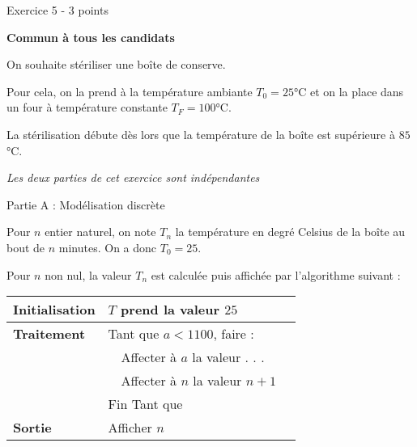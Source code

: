 
%
\begin{h2}Exercice 5 - 3 points\end{h2} 
\par
\textbf{Commun à tous les candidats}
\par
On souhaite stériliser une boîte de conserve.
\par
Pour cela, on la prend à la température ambiante $T_0 = 25$°C et on la place dans un four à température constante $T_F = 100$°C.
\par
La stérilisation débute dès lors que la température de la boîte est supérieure à $85$°C.
\par
\textit{Les deux parties de cet exercice sont indépendantes}
\par
\begin{h3}Partie A : Modélisation discrète\end{h3}
Pour $n$ entier naturel, on note $T_n$ la température en degré Celsius de la boîte au bout de $n$ minutes. On a donc $T_0 = 25$.
\par
Pour $n$ non nul, la valeur $T_n$ est calculée puis affichée par l'algorithme suivant :
     \begin{tabularx}{0.8\linewidth}{|*{3}{>{\centering \arraybackslash }X|}}%
          \hline

          \textbf{Initialisation}  &  $T$ prend la valeur $25$
          \\ \hline
               \textbf{Traitement	}  & Tant que $a < 1 100$, faire :
          \\ \hline
          & $ \quad $Affecter à $a$ la valeur . . .
          \\ \hline
          &  $ \quad $Affecter à $n$ la valeur $n + 1$
          \\ \hline
          & Fin Tant que
          \\ \hline
          \textbf{Sortie}  & Afficher $n$
          \\ \hline
     \end{tabularx}

